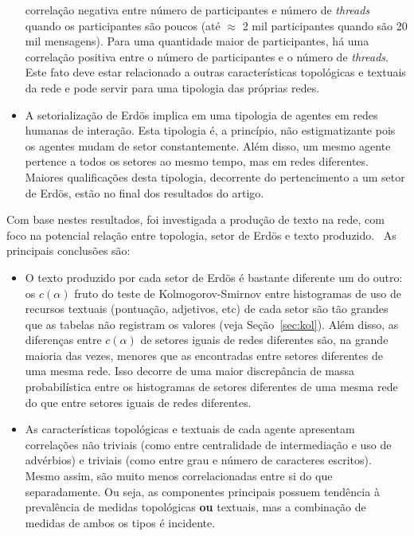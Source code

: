 \documentclass[a4paper,openright,12pt]{report} %
\begin{document}
\begin{itemize}
    correlação negativa entre número de participantes e número de \emph{threads} quando os participantes são poucos 
    (até $\approx$ 2 mil participantes quando são 20 mil mensagens).
    Para uma quantidade maior de participantes,
    há uma correlação positiva entre o número de participantes e o número de \emph{threads}.
    Este fato deve estar relacionado a outras características topológicas e textuais da rede e 
    pode servir para uma tipologia das próprias redes.
    \item A setorialização de Erdös implica em uma
        tipologia de agentes em redes humanas de interação.
        Esta tipologia é, a princípio, não estigmatizante pois os agentes mudam de setor constantemente.
        Além disso, um mesmo agente pertence a todos os setores ao mesmo tempo, mas em redes diferentes.
        Maiores qualificações desta tipologia, decorrente do pertencimento
	a um setor de Erdös, estão no final dos resultados do artigo.~\cite{timeS}
\end{itemize}

Com base nestes resultados, foi investigada a produção de texto na rede,
com foco na potencial relação entre topologia,
setor de Erdös e texto produzido.~\cite{rcText}
As principais conclusões são:
\begin{itemize}
    \item O texto produzido por cada setor de Erdös é bastante diferente um do outro:
        os $c(\alpha)$ fruto do teste de Kolmogorov-Smirnov
        entre histogramas
        de uso de recursos textuais (pontuação, adjetivos, etc) de cada setor
        são tão grandes que as tabelas não registram os valores (veja Seção~\ref{sec:kol}).
        Além disso, as diferenças entre $c(\alpha)$ de setores iguais de redes diferentes são,
        na grande maioria das vezes, menores que as encontradas entre setores diferentes de uma mesma rede.
        Isso decorre de uma maior discrepância de massa probabilística entre os histogramas de setores diferentes de uma mesma rede do que entre setores iguais de redes diferentes. 

    \item As características topológicas e textuais de cada agente apresentam correlações não triviais (como entre centralidade de intermediação e uso de advérbios) e triviais (como entre grau e número de caracteres escritos).
        Mesmo assim, são muito menos correlacionadas entre si do que separadamente. Ou seja, as componentes principais possuem tendência
        à prevalência de medidas topológicas {\bf ou} textuais,
        mas a combinação de medidas de ambos os tipos é incidente.
\end{itemize}
\end{document}
